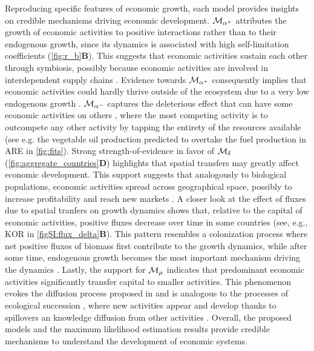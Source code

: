 Reproducing specific features of economic growth, each model provides insights on credible mechanisms driving economic development.
% 
$\mathcal{M}_{\alpha^+}$ attributes the growth of economic activities to positive interactions rather than to their endogenous growth, since its dynamics is associated with high self-limitation coefficients (\cref{fig:r_b}\textbf{B}). This suggests that economic activities sustain each other through symbiosis, possibly because economic activities are involved in interdependent supply chains \cite{Ozman2009,Saavedra2009a}. Evidence towards $\mathcal{M}_{\alpha^+}$ consequently implies that economic activities could hardly thrive outside of the ecosystem due to a very low endogenous growth \cite{Yukalov2012}.
% 
$\mathcal{M}_{\alpha^-}$ captures the deleterious effect that can have some economic activities on others \cite{Wernerfelt1989}, where the most competing activity is to outcompete any other activity by tapping the entirety of the resources available (see e.g. the vegetable oil production predicted to overtake the fuel production in ARE in \cref{fig:fits}).
% 
Strong strength-of-evidence in favor of $\mathcal{M}_\delta$ (\cref{fig:aggregate_countries}\textbf{D}) highlights that spatial transfers may greatly affect economic development. This support suggests that analogously to biological populations, economic activities spread across geographical space, possibly to increase profitability and reach new markets \cite{Luo2007}.
% 
A closer look at the effect of fluxes due to spatial tranfers on growth dynamics shows that, relative to the capital of economic activities, positive fluxes decrease over time in some countries (see, e.g., KOR in \cref{figSI:flux_delta}\textbf{B}). This pattern resembles a colonization process where net positive fluxes of biomass first contribute to the growth dynamics, while after some time, endogenous growth becomes the most important mechanism driving the dynamics \cite{Leibold2004}. 
%
Lastly, the support for $\mathcal{M}_\mu$ indicates that predominant economic activities significantly transfer capital to smaller activities. This phenomenon evokes the diffusion process proposed in \cite{C.A.HidalgoB.Klinger} and is analogous to the processes of ecological succession \cite{Odum1969}, where new activities appear and develop thanks to spillovers an knowledge diffusion from other activities \cite{}.
% 
Overall, the proposed models and the maximum likelihood estimation results provide credible mechanisms to understand the development of economic systems.

